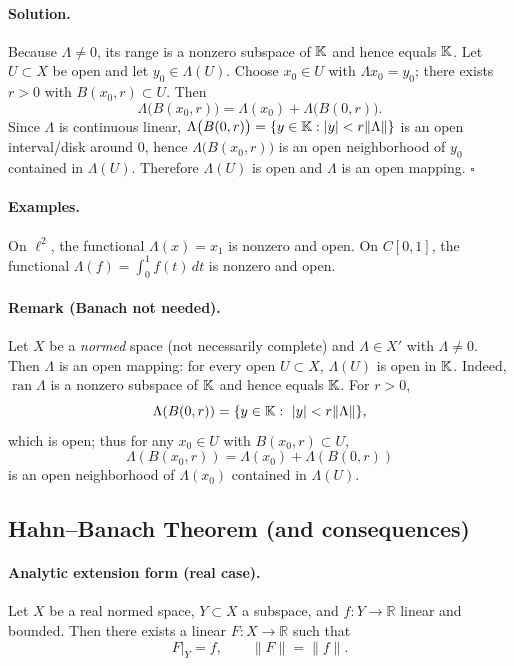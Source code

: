\documentclass[12pt,a4paper]{article}
\newcommand{\qed}{\hfill$\square$}
\theoremstyle{plain}
\theoremstyle{definition}
\theoremstyle{remark}
\theoremstyle{remark}
\theoremstyle{definition}
\begin{document}
	\paragraph{Solution.}
	Because $\Lambda\neq 0$, its range is a nonzero subspace of $\Bbb K$ and hence equals $\Bbb K$.
	Let $U\subset X$ be open and let $y_0\in \Lambda(U)$.
	Choose $x_0\in U$ with $\Lambda x_0=y_0$; there exists $r>0$ with $B(x_0,r)\subset U$.
	Then
	\[
	\Lambda\big(B(x_0,r)\big)=\Lambda(x_0)+\Lambda\big(B(0,r)\big).
	\]
	Since $\Lambda$ is continuous linear, $\Lambda\big(B(0,r)\big)=\{y\in\Bbb K:|y|< r\|\Lambda\|\}$ is an open interval/disk around $0$,
	hence $\Lambda\big(B(x_0,r)\big)$ is an open neighborhood of $y_0$ contained in $\Lambda(U)$.
	Therefore $\Lambda(U)$ is open and $\Lambda$ is an open mapping.
	\qed
	
	\paragraph{Examples.}
	On $\ell^2$, the functional $\Lambda(x)=x_1$ is nonzero and open.
	On $C[0,1]$, the functional $\Lambda(f)=\int_0^1 f(t)\,dt$ is nonzero and open.
	
	\paragraph{Remark (Banach not needed).}
	Let $X$ be a \emph{normed} space (not necessarily complete) and
	$\Lambda\in X'$ with $\Lambda\neq 0$.
	Then $\Lambda$ is an open mapping: for every open $U\subset X$, $\Lambda(U)$ is open in $\Bbb K$.
	Indeed, $\operatorname{ran}\Lambda$ is a nonzero subspace of $\Bbb K$ and hence equals $\Bbb K$.
	For $r>0$,
	\[
	\Lambda(B(0,r))=\{y\in\Bbb K:\ |y|< r\|\Lambda\|\},
	\]
	which is open; thus for any $x_0\in U$ with $B(x_0,r)\subset U$,
	\[
	\Lambda(B(x_0,r))=\Lambda(x_0)+\Lambda(B(0,r))
	\]
	is an open neighborhood of $\Lambda(x_0)$ contained in $\Lambda(U)$.
	
	\subsection*{Hahn--Banach Theorem (and consequences)}
	
	\paragraph{Analytic extension form (real case).}
	Let $X$ be a real normed space, $Y\subset X$ a subspace, and $f:Y\to\mathbb R$ linear and bounded.
	Then there exists a linear $F:X\to\mathbb R$ such that
	\[
	F|_Y=f,\qquad \|F\|=\|f\|.
	\]
	
\end{document}
